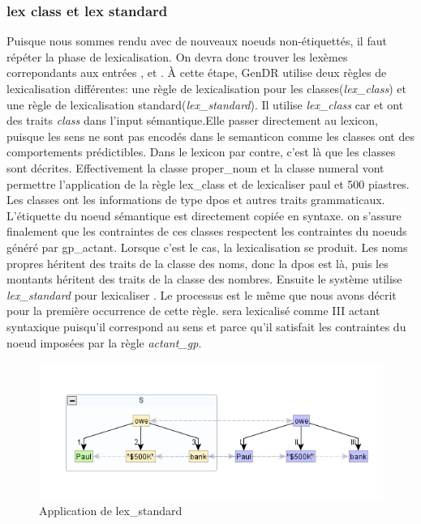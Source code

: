 \subsubsection{lex class et lex standard}
Puisque nous sommes rendu avec de nouveaux noeuds non-étiquettés, il faut répéter la phase de lexicalisation. On devra donc trouver les lexèmes correpondants aux entrées ,  et . À cette étape, GenDR utilise deux règles de lexicalisation différentes: une règle de lexicalisation pour les classes(\emph{lex\_class}) et une règle de lexicalisation standard(\emph{lex\_standard}). Il utilise \emph{lex\_class} car  et  ont des traits \emph{class} dans l'input sémantique.Elle passer directement au lexicon, puisque les sens ne sont pas encodés dans le semanticon comme les classes ont des comportements prédictibles. Dans le lexicon par contre, c'est là que les classes sont décrites. Effectivement la classe proper\_noun et la classe numeral vont permettre l'application de la règle lex\_class et de lexicaliser paul et 500 piastres. Les classes ont les informations de type dpos et autres traits grammaticaux. L'étiquette du noeud sémantique est directement copiée en syntaxe. on s'assure finalement que les contraintes de ces classes respectent les contraintes du noeuds généré par gp\_actant. Lorsque c'est le cas, la lexicalisation se produit. Les noms propres héritent des traits de la classe des noms, donc la dpos est là, puis les montants héritent des traits de la classe des nombres. Ensuite le système utilise \emph{lex\_standard} pour lexicaliser . Le processus est le même que nous avons décrit pour la première occurrence de cette règle. sera lexicalisé comme III actant syntaxique puisqu'il correspond au sens  et parce qu'il satisfait les contraintes du noeud imposées par la règle \emph{actant\_gp}.

\begin{figure}[htb]
	\centering
	\includegraphics[width=1\textwidth, trim = {0cm 0cm 0cm 0cm},clip]{ch3/figs/lex_standard2.png}
	\caption{Application de lex\_standard}
	\label{fig:lexstand2}
\end{figure}

